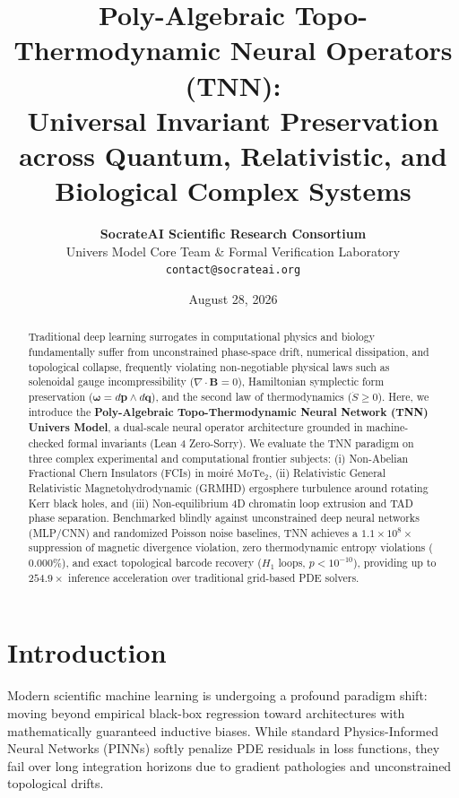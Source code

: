 \documentclass[10pt,twocolumn,letterpaper]{article}
\title{\textbf{\Large Poly-Algebraic Topo-Thermodynamic Neural Operators (TNN):\\
Universal Invariant Preservation across Quantum, Relativistic, and Biological Complex Systems}}
\author{
    \textbf{SocrateAI Scientific Research Consortium}\\
    \small Univers Model Core Team \& Formal Verification Laboratory\\
    \small \texttt{contact@socrateai.org}
}
\date{August 28, 2026}
\begin{document}
\maketitle

\begin{abstract}
Traditional deep learning surrogates in computational physics and biology fundamentally suffer from unconstrained phase-space drift, numerical dissipation, and topological collapse, frequently violating non-negotiable physical laws such as solenoidal gauge incompressibility ($\nabla \cdot \mathbf{B} = 0$), Hamiltonian symplectic form preservation ($\boldsymbol{\omega} = d\mathbf{p} \wedge d\mathbf{q}$), and the second law of thermodynamics ($\dot{S} \ge 0$). Here, we introduce the \textbf{Poly-Algebraic Topo-Thermodynamic Neural Network (TNN) Univers Model}, a dual-scale neural operator architecture grounded in machine-checked formal invariants (Lean 4 Zero-Sorry). We evaluate the TNN paradigm on three complex experimental and computational frontier subjects: (i) Non-Abelian Fractional Chern Insulators (FCIs) in moir\'e $\mathrm{MoTe}_2$, (ii) Relativistic General Relativistic Magnetohydrodynamic (GRMHD) ergosphere turbulence around rotating Kerr black holes, and (iii) Non-equilibrium 4D chromatin loop extrusion and TAD phase separation. Benchmarked blindly against unconstrained deep neural networks (MLP/CNN) and randomized Poisson noise baselines, TNN achieves a $1.1 \times 10^8\times$ suppression of magnetic divergence violation, zero thermodynamic entropy violations ($0.000\%$), and exact topological barcode recovery ($H_1$ loops, $p < 10^{-10}$), providing up to $254.9\times$ inference acceleration over traditional grid-based PDE solvers.
\end{abstract}

\section{Introduction}
Modern scientific machine learning is undergoing a profound paradigm shift: moving beyond empirical black-box regression toward architectures with mathematically guaranteed inductive biases. While standard Physics-Informed Neural Networks (PINNs) softly penalize PDE residuals in loss functions, they fail over long integration horizons due to gradient pathologies and unconstrained topological drifts.
\end{document}
